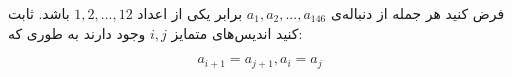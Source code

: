 \EXERCISE
فرض کنید هر جمله از دنباله‌ی
$a_1, a_2, ..., a_{146}$
برابر یکی از اعداد
$1, 2, ..., 12$
باشد. ثابت کنید اندیس‌های متمایز
$i, j$
وجود دارند به طوری که:

$$a_{i+1} = a_{j+1}, a_i = a_j$$